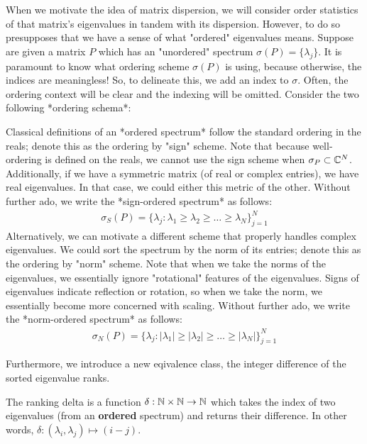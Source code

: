 When we motivate the idea of matrix dispersion, we will consider order statistics of that matrix's eigenvalues in tandem with its dispersion. However, to do so presupposes that we have a sense of what "ordered" eigenvalues means. Suppose are given a matrix $P$ which has an "unordered" spectrum $\sigma(P) = \{\lambda_j\}$. It is paramount to know what ordering scheme $\sigma(P)$ is using, because otherwise, the indices are meaningless! So, to delineate this, we add an index to $\sigma$. Often, the ordering context will be clear and the indexing will be omitted. Consider the two following *ordering schema*:

Classical definitions of an *ordered spectrum* follow the standard ordering in the reals; denote this as the ordering by "sign" scheme. Note that because well-ordering is defined on the reals, we cannot use the sign scheme when $\sigma_P \subset \mathbb{C}^N$. Additionally, if we have a symmetric matrix (of real or complex entries), we have real eigenvalues. In that case, we could either this metric of the other. Without further ado, we write the *sign-ordered spectrum* as follows:
\begin{align*}
\sigma_S(P) = \{\lambda_j : \lambda_1 \geq \lambda_2 \geq \dots \geq \lambda_N\}_{j = 1}^N
\end{align*}
Alternatively, we can motivate a different scheme that properly handles complex eigenvalues. We could sort the spectrum by the norm of its entries; denote this as the ordering by "norm" scheme. Note that when we take the norms of the eigenvalues, we essentially ignore "rotational" features of the eigenvalues. Signs of eigenvalues indicate reflection or rotation, so when we take the norm, we essentially become more concerned with scaling. Without further ado, we write the *norm-ordered spectrum* as follows:
\begin{align*}
\sigma_N(P) = \{\lambda_j : |\lambda_1| \geq |\lambda_2| \geq \dots \geq |\lambda_N|\}_{j = 1}^N
\end{align*}

Furthermore, we introduce a new eqivalence class, the integer difference of the sorted eigenvalue ranks.

\begin{definition}
The ranking delta is a function $\delta: \mathbb{N} \times \mathbb{N} \to \mathbb{N}$ which takes the index of two eigenvalues (from an \textbf{ordered} spectrum) and returns their difference. In other words, $\delta : (\lambda_i,\lambda_j) \mapsto (i - j)$.
\end{definition}

